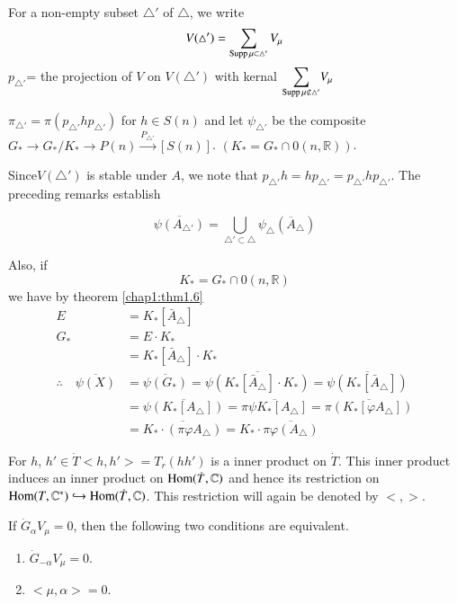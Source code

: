 \begin{notns}
  For a non-empty subset $\triangle'$ of $\triangle$, we write
  $$
  V (\triangle')= \sum_{\operatorname{Supp} \mu \subset \triangle'} V_\mu
  $$
  $p_{\triangle'}$= the projection of $V$ on $V(\triangle')$ with
  kernal $\displaystyle{\sum_{\Supp \mu \nsubset \triangle'}} V_\mu$

  $\pi_{\triangle'}= \pi (p_{\triangle'} h p_{\triangle'})$ for $h
  \in S(n)$ and let $\psi_{\triangle'}$ be the composite $G_* \to G_*
  /K_* \to P(n)\xrightarrow{P_{\triangle'}}[S(n)]$. $(K_* = G_* \cap 0
  (n, \mathbb{R}))$.
\end{notns}

Since\pageoriginale $V(\triangle')$ is stable under $A$, we note that
$p_{\triangle'} h = h p_{\triangle'}= p_{\triangle'}h
p_{\triangle'}$. The preceding remarks establish

\begin{lemma} \label{chap2:lem2.2}
  $$
  \overline{\psi (A_{\triangle'})}= \bigcup_{\triangle' \subset
    \triangle} \psi_\triangle (\overline{A}_\triangle)
  $$
\end{lemma}

  Also, if 
  $$
  K_* = G_* \cap 0 (n, \mathbb{R})
  $$
  we have by theorem \ref{chap1:thm1.6}
  \begin{align*}
    E & = K_* [\bar{A}_\triangle]\\
    G_* & = E \cdot K_* \\
    & = K_* [\bar{A}_\triangle] \cdot K_*\\
    \therefore \quad \overline{\psi (X)} & = \overline{\psi (G_*)}=
    \overline{\psi (K_* [\bar{A}_\triangle]\cdot K_*)}= \overline{\psi
    (K_* [\bar{A}_\triangle])}\\
    & = \overline{\psi (K_* [A_\triangle])} = \overline{\pi \psi K_*
      [A_\triangle]}= \overline{\pi (K_* [\varphi A_\triangle])}\\
    & = \overline{K_* \cdot (\pi \varphi A_\triangle)}= K_* \cdot
    \overline{\pi \varphi (A_\triangle)}
  \end{align*}

For $h$, $h' \in \dot{T} < h, h'> = T_r (hh')$ is a inner product on
$\dot{T}$. This inner product induces an inner product on $\operatorname{Hom}
(\dot{T}, \mathbb{C})$ and hence its restriction on $\operatorname{Hom} (T,
\mathbb{C}^*) \hookrightarrow \operatorname{Hom} (\dot{T}, \mathbb{C})$. This
restriction will again be denoted by $<, >$. 

\begin{lemma} \label{chap2:lem2.3}
  If $\dot{G}_\alpha V_\mu =0$, then the following two conditions are
  equivalent.
  \begin{enumerate}
    \item $\dot{G}_{- \alpha} V_\mu =0$.
      \item $<\mu, \alpha>=0$.
  \end{enumerate}
\end{lemma}

